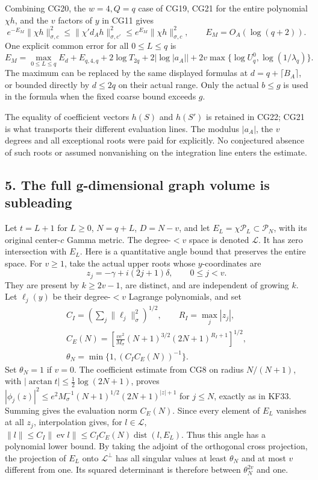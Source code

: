Combining CG20, the \(w=4,Q=q\) case of CG19, CG21 for the entire polynomial \(\chi h\), and the \(v\) factors of \(y\) in CG11 gives \[
\boxed{e^{-E_M}\|\chi h\|_{\sigma,c}^2
\le\|\chi'd_Ah\|_{\sigma,c'}^2
\le e^{E_M}\|\chi h\|_{\sigma,c}^2,\qquad E_M=O_A(\log(q+2)).}
\tag{CG22}
\] One explicit common error for all \(0\le L\le q\) is \[
E_M=\max_{0\le L\le q}E_d
+E_{q,4,q}+2\log T_{2q}+2|\log|a_A||
+2v\max\{\log U_q^0,\log(1/\lambda_q)\}.
\] The maximum can be replaced by the same displayed formulas at \(d=q+\lceil B_A\rceil\), or bounded directly by \(d\le2q\) on their actual range. Only the actual \(b\le g\) is used in the formula when the fixed coarse bound exceeds \(g\).

The equality of coefficient vectors \(h(S)\) and \(h(S')\) is retained in CG22; CG21 is what transports their different evaluation lines. The modulus \(|a_A|\), the \(v\) degrees and all exceptional roots were paid for explicitly. No conjectured absence of such roots or assumed nonvanishing on the integration line enters the estimate.

\subsection{5. The full g-dimensional graph volume is subleading}\label{the-full-g-dimensional-graph-volume-is-subleading}

Let \(t=L+1\) for \(L\ge0\), \(N=q+L\), \(D=N-v\), and let \(E_L=\chi\mathcal P_L\subset\mathcal P_N\), with its original center-\(c\) Gamma metric. The degree-\(<v\) space is denoted \(\mathcal L\). It has zero intersection with \(E_L\). Here is a quantitative angle bound that preserves the entire space. For \(v\ge1\), take the actual upper roots whose \(y\)-coordinates are \[
z_j=-\gamma+i(2j+1)\delta,\qquad0\le j<v.
\] They are present by \(k\ge2v-1\), are distinct, and are independent of growing \(k\). Let \(\ell_j(y)\) be their degree-\(<v\) Lagrange polynomials, and set \[
\begin{gathered} C_I=\left(\sum_j\|\ell_j\|_\sigma^2\right)^{1/2},\qquad R_I=\max_j|z_j|,\\
C_E(N)=\left[\frac{ve^2}{M_\sigma}(N+1)^{3/2}
 (2N+1)^{R_I+1}\right]^{1/2},\\
\theta_N=\min\{1,(C_IC_E(N))^{-1}\}.\end{gathered}
\tag{CG23}
\] Set \(\theta_N=1\) if \(v=0\). The coefficient estimate from CG8 on radius \(N/(N+1)\), with \(|\arctan t|\le\tfrac12\log(2N+1)\), proves \(|\phi_j(z)|^2\le e^2M_\sigma^{-1}(N+1)^{1/2}
 (2N+1)^{|z|+1}\) for \(j\le N\), exactly as in KF33. Summing gives the evaluation norm \(C_E(N)\). Since every element of \(E_L\) vanishes at all \(z_j\), interpolation gives, for \(l\in\mathcal L\), \(\|l\|\le C_I\|\operatorname{ev}l\|
\le C_IC_E(N)\operatorname{dist}(l,E_L)\). Thus this angle has a polynomial lower bound. By taking the adjoint of the orthogonal cross projection, the projection of \(E_L\) onto \(\mathcal L^\perp\) has all singular values at least \(\theta_N\) and at most \(v\) different from one. Its squared determinant is therefore between \(\theta_N^{2v}\) and one.

